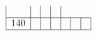 \documentclass{article}
\begin{document}
{$$\begin{array}{|r|*{6}{r|}}
 & 
 & 
 & 
\\
\hline
140 
 & 
 & 
 & 
 & 
 & 
 & 
\\
\hline
\end{array}
$$


%


%


}%
\end{document}

